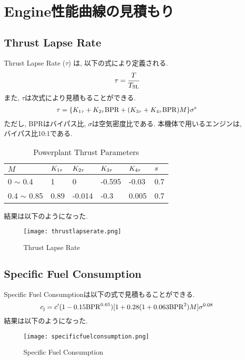 \documentclass[12pt]{jsarticle}
\begin{document}
\section{Engine性能曲線の見積もり}
\subsection{Thrust Lapse Rate}
Thrust Lapse Rate ($\tau$) は, 以下の式により定義される.
\begin{eqnarray*}
\tau = \cfrac{T}{T_{\rm SL}}
\end{eqnarray*}
また, $\tau$は次式により見積もることができる.
\begin{eqnarray*}
\tau = \{K_{1\tau} + K_{2\tau}{\rm BPR} + (K_{3\tau} + K_{4\tau}{\rm BPR})M \} \sigma^{\rm s}
\end{eqnarray*}
ただし, BPRはバイパス比, $\sigma$は空気密度比である. 本機体で用いるエンジンは, バイパス比10:1である. 
\begin{table}[H]
	\caption{Powerplant Thrust Parameters}
	\begin{center}
		\begin{tabular}{p{2cm} p{1cm} p{1cm} p{1cm} p{1cm} p{1cm}} \hline
			$M$ & $K_{\rm 1\tau}$ & $K_{\rm 2\tau}$ & $K_{\rm 3\tau}$ & $K_{\rm 4\tau}$ & $s$ \\ \hline\hline
			 0 $\sim$ 0.4 & 1 & 0 & -0.595 & -0.03 & 0.7 \\ \hline
			 0.4 $\sim$ 0.85 & 0.89 & -0.014 & -0.3 & 0.005 & 0.7 \\ \hline
		\end{tabular}
	\end{center}
\end{table}
結果は以下のようになった.
\begin{figure}[H]
\begin{center}
\texttt{[image: thrustlapserate.png]}
\caption{Thrust Lapse Rate}
\end{center}
\end{figure}

\subsection{Specific Fuel Consumption}
Specific Fuel Consumptionは以下の式で見積もることができる.
\begin{eqnarray*}
c_{\rm j} = c^{\prime}(1 - 0.15{\rm BPR}^{0.65})[1 + 0.28(1 + 0.063{\rm BPR}^2) M]\sigma^{0.08}
\end{eqnarray*}
結果は以下のようになった.
\begin{figure}[H]
\begin{center}
\texttt{[image: specificfuelconsumption.png]}
\caption{Specific Fuel Consumption}
\end{center}
\end{figure}
\end{document}

